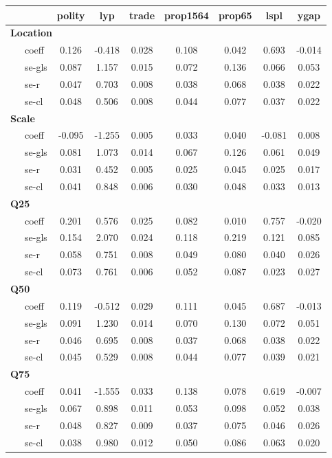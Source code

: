 \begin{table}
    \centering
    \begin{tabular}{lccccccc}
    \hline
     & polity & lyp & trade & prop1564 & prop65 & lspl & ygap \\
    \hline
    \multicolumn{8}{l}{\textbf{Location}} \\
    \ \ \ coeff & 0.126 & -0.418 & 0.028 & 0.108 & 0.042 & 0.693 & -0.014 \\
    \ \ \ se-gls & 0.087 & 1.157 & 0.015 & 0.072 & 0.136 & 0.066 & 0.053 \\
    \ \ \ se-r & 0.047 & 0.703 & 0.008 & 0.038 & 0.068 & 0.038 & 0.022 \\
    \ \ \ se-cl & 0.048 & 0.506 & 0.008 & 0.044 & 0.077 & 0.037 & 0.022 \\
    \hline
    \multicolumn{8}{l}{\textbf{Scale}} \\
    \ \ \ coeff & -0.095 & -1.255 & 0.005 & 0.033 & 0.040 & -0.081 & 0.008 \\
    \ \ \ se-gls & 0.081 & 1.073 & 0.014 & 0.067 & 0.126 & 0.061 & 0.049 \\
    \ \ \ se-r & 0.031 & 0.452 & 0.005 & 0.025 & 0.045 & 0.025 & 0.017 \\
    \ \ \ se-cl & 0.041 & 0.848 & 0.006 & 0.030 & 0.048 & 0.033 & 0.013 \\
    \hline
    \multicolumn{8}{l}{\textbf{Q25}} \\
    \ \ \ coeff & 0.201 & 0.576 & 0.025 & 0.082 & 0.010 & 0.757 & -0.020 \\
    \ \ \ se-gls & 0.154 & 2.070 & 0.024 & 0.118 & 0.219 & 0.121 & 0.085 \\
    \ \ \ se-r & 0.058 & 0.751 & 0.008 & 0.049 & 0.080 & 0.040 & 0.026 \\
    \ \ \ se-cl & 0.073 & 0.761 & 0.006 & 0.052 & 0.087 & 0.023 & 0.027 \\
    \hline
    \multicolumn{8}{l}{\textbf{Q50}} \\
    \ \ \ coeff & 0.119 & -0.512 & 0.029 & 0.111 & 0.045 & 0.687 & -0.013 \\
    \ \ \ se-gls & 0.091 & 1.230 & 0.014 & 0.070 & 0.130 & 0.072 & 0.051 \\
    \ \ \ se-r & 0.046 & 0.695 & 0.008 & 0.037 & 0.068 & 0.038 & 0.022 \\
    \ \ \ se-cl & 0.045 & 0.529 & 0.008 & 0.044 & 0.077 & 0.039 & 0.021 \\
    \hline
    \multicolumn{8}{l}{\textbf{Q75}} \\
    \ \ \ coeff & 0.041 & -1.555 & 0.033 & 0.138 & 0.078 & 0.619 & -0.007 \\
    \ \ \ se-gls & 0.067 & 0.898 & 0.011 & 0.053 & 0.098 & 0.052 & 0.038 \\
    \ \ \ se-r & 0.048 & 0.827 & 0.009 & 0.037 & 0.075 & 0.046 & 0.026 \\
    \ \ \ se-cl & 0.038 & 0.980 & 0.012 & 0.050 & 0.086 & 0.063 & 0.020 \\
    \hline
    \end{tabular}
    \end{table}
